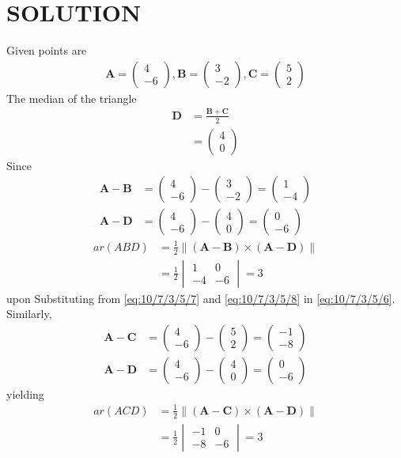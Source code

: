 \documentclass[12pt]{article}
\newcommand{\mydet}[1]{\ensuremath{\begin{vmatrix}#1\end{vmatrix}}}
\providecommand{\brak}[1]{\ensuremath{\left(#1\right)}}
\newcommand{\myvec}[1]{\ensuremath{\begin{pmatrix}#1\end{pmatrix}}}
\providecommand{\norm}[1]{\left\lVert#1\right\rVert}
\let\vec\mathbf
\begin{document}
\section{SOLUTION}
Given points are
\begin{align}
\vec{A}=\myvec{4\\ -6} ,
\vec{B}=\myvec{3\\ -2} ,
\vec{C}=\myvec{5\\ 2}
\end{align}
\fi
The median of the triangle 
\begin{align}
\vec{D}&=\frac{\vec{B}+\vec{C}}{2}\\
&=\myvec{4\\ 0}
\end{align}
Since 
\begin{align}
	\vec{A}- \vec{B} &= \myvec{4\\ -6}-\myvec{3\\ -2}=\myvec{1\\ -4}\label{eq:10/7/3/5/7}\\
	  \vec{A}- \vec{D} &= \myvec{4\\ -6}-\myvec{4\\ 0}=\myvec{0\\ -6}\label{eq:10/7/3/5/8}
  \end{align}
 \begin{align}
  ar(ABD)&=\frac{1}{2} \norm{\brak{\vec{A}-\vec{B}}  \times 
   \brak{\vec{A}- \vec{D}}} \label{eq:10/7/3/5/6} 
   \\
&=\frac{1}{2}\mydet{1 & 0\\-4 & -6}
	       =3	
\end{align}
upon
Substituting from \eqref{eq:10/7/3/5/7} and \eqref{eq:10/7/3/5/8} in \eqref{eq:10/7/3/5/6}.
		Similarly, 
\begin{align}
	\vec{A}- \vec{C} &= \myvec{4\\ -6}-\myvec{5\\ 2}=\myvec{-1\\ -8}\label{eq:10/7/3/5/13} \\
	  \vec{A}- \vec{D} &= \myvec{4\\ -6}-\myvec{4\\ 0}=\myvec{0\\ -6}\label{eq:10/7/3/5/14} 
  \end{align}
  yielding
  \begin{align}
  ar(ACD)&=\frac{1}{2} \norm{\brak{\vec{A}-\vec{C}}  \times 
   \brak{\vec{A}- \vec{D}}} \label{eq:10/7/3/5/12}
   \\
	&=\frac{1}{2}\mydet{-1 & 0\\-8 & -6}= 3
\end{align}
\end{document}

